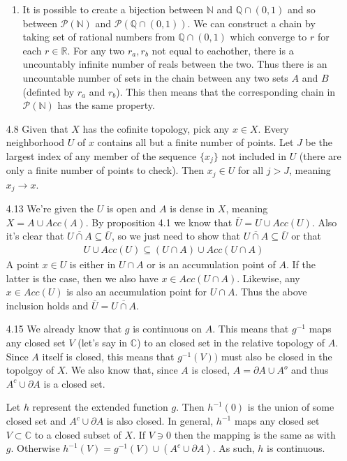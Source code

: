 \documentclass[11pt,letter]{article}
\begin{document}
\begin{enumerate}
\begin{enumerate}
        \item It is possible to create a bijection between $\mathbb{N}$ and $\mathbb{Q} \cap (0,1)$ and so between $\mathcal{P}(\mathbb{N})$ and $\mathcal{P}(\mathbb{Q} \cap (0,1))$. We can construct a chain by taking set of rational numbers from $\mathbb{Q} \cap (0,1)$ which converge to $r$ for each $r \in \mathbb{R}$. For any two $r_a, r_b$ not equal to eachother, there is a uncountably infinite number of reals between the two. Thus there is an uncountable number of sets in the chain between any two sets $A$ and $B$ (definted by $r_a$ and $r_b$). This then means that the corresponding chain in $\mathcal{P}(\mathbb{N})$ has the same property.
    \end{enumerate}
    
    \item[4.8] Given that $X$ has the cofinite topology, pick any $x \in X$. Every neighborhood $U$ of $x$ contains all but a finite number of points. Let $J$ be the largest index of any member of the sequence $\{x_j\}$ not included in $U$ (there are only a finite number of points to check). Then $x_j \in U$ for all $j > J$, meaning $x_j \rightarrow x$.
    
    \item[4.13] We're given the $U$ is open and $A$ is dense in $X$, meaning $X = A \cup Acc(A)$. By proposition 4.1 we know that $\overline{U} = U \cup Acc(U)$. Also it's clear that $\overline{U \cap A} \subseteq \overline{U}$, so we just need to show that $\overline{U \cap A} \subseteq \overline{U}$ or that 
    \begin{align*}
        U \cup Acc(U) \subseteq (U \cap A) \cup Acc(U \cap A)
    \end{align*}
    A point $x \in U$ is either in $U \cap A$ or is an accumulation point of $A$. If the latter is the case, then we also have $x \in Acc(U \cap A)$. Likewise, any $x \in Acc(U)$ is also an accumulation point for $U \cap A$. Thus the above inclusion holds and $\overline{U} = \overline{U \cap A}$.
    
    \item[4.15] We already know that $g$ is continuous on $A$. This means that $g^{-1}$ maps any closed set $V$ (let's say in $\mathbb{C}$) to an closed set in the relative topology of $A$. Since $A$ itself is closed, this means that $g^{-1}(V))$ must also be closed in the topolgoy of $X$. We also know that, since $A$ is closed, $A = \partial A \cup A^o$ and thus $A^c \cup \partial A$ is a closed set. 
    
    Let $h$ represent the extended function $g$. Then $h^{-1}(0)$ is the union of some closed set and $A^c \cup \partial A$ is also closed. In general, $h^{-1}$ maps any closed set $V \subset \mathbb{C}$ to a closed subset of $X$. If $V \ni 0$ then the mapping is the same as with $g$. Otherwise $h^{-1}(V) = g^{-1}(V) \cup (A^c \cup \partial A)$. As such, $h$ is continuous.
\end{enumerate}
\end{document}

